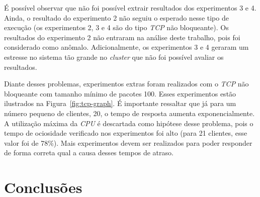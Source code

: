 \documentclass[12pt]{article}
\begin{document}
É possível observar que não foi possível extrair resultados dos experimentos 3 e 4. Ainda, o resultado do experimento 2 não seguiu o esperado nesse tipo de execução (os experimentos 2, 3 e 4 são do tipo \emph{TCP} não bloqueante). Os resultados do experimento 2 não entraram na análise deste trabalho, pois foi considerado como anômalo. Adicionalmente, os experimentos 3 e 4 geraram um estresse no sistema tão grande no \emph{cluster} que não foi possível avaliar os resultados.

Diante desses problemas, experimentos extras foram realizados com o \emph{TCP} não bloqueante com tamanho mínimo de pacotes 100. Esses experimentos estão ilustrados na Figura~\ref{fig:tcp-graph}. É importante ressaltar que já para um número pequeno de clientes, 20, o tempo de resposta aumenta exponencialmente. A utilização máxima da \emph{CPU} é descartada como hipótese desse problema, pois o tempo de ociosidade verificado nos experimentos foi alto (para 21 clientes, esse valor foi de 78\%). Mais experimentos devem ser realizados para poder responder de forma correta qual a causa desses tempos de atraso.

\section{Conclusões} \label{sec:conclusoes}





\end{document}
